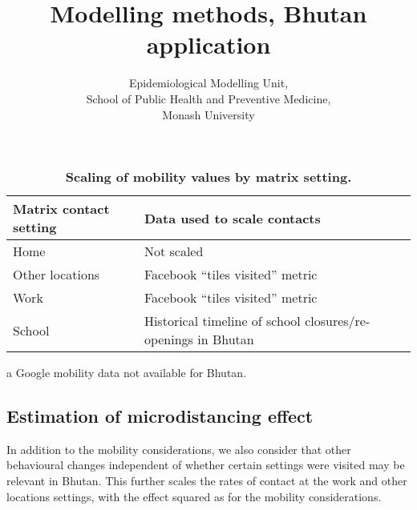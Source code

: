 \documentclass{article}
\author{
    Epidemiological Modelling Unit,
    \\ School of Public Health and Preventive Medicine,
    \\ Monash University
}
\title{Modelling methods, Bhutan application}
\begin{document}
\maketitle
\tableofcontents
\newpage










\begin{table}[h]
    \begin{threeparttable}
    \begin{tabularx}{\textwidth}{| X | X |}
        \hline
        \textbf{Matrix contact setting} & \textbf{Data used to scale contacts} \\
        \hline
        Home & Not scaled \\
        \hline
        Other locations & Facebook ``tiles visited'' metric \tnote{a} \\
        \hline
        Work & Facebook ``tiles visited'' metric \tnote{a} \\
        \hline
        School & Historical timeline of school closures/re-openings in Bhutan \\
        \hline
	\end{tabularx}
	\caption{\textbf{Scaling of mobility values by matrix setting.}}
	\label{tab:location_scaling}
    \begin{tablenotes}
        \item[a] Google mobility data not available for Bhutan.
    \end{tablenotes}
    \end{threeparttable}
\end{table}

\subsection{Estimation of microdistancing effect}
In addition to the mobility considerations, we also consider that other
behavioural changes independent of whether certain settings were visited
may be relevant in Bhutan.
This further scales the rates of contact at the work and other locations settings,
with the effect squared as for the mobility considerations.
\end{document}
